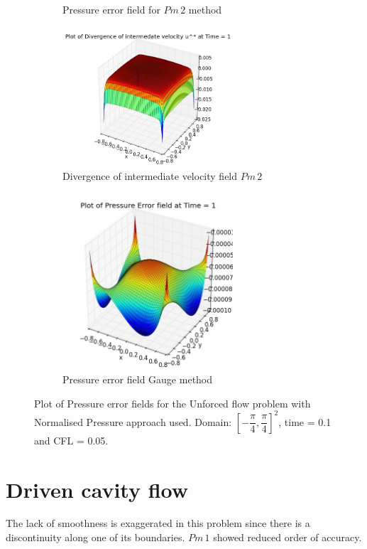 \begin{figure}[H]
\begin{subfigure}[t]{2.5in}
		\caption{Pressure error field for $Pm\,2$ method}\label{fig:6.19a}		
	\end{subfigure}
	\quad
	\begin{subfigure}[t]{2.5in}
		\centering
		\includegraphics[width=2.5in]{figures/Pm2_unf1_np_div_uvstar_t_1_grid_60.jpg}
		\caption{Divergence of intermediate velocity field $Pm\,2$}\label{fig:6.19b}
	\end{subfigure}
	\quad
	\begin{subfigure}[t]{2.5in}
		\centering
		\includegraphics[width=2.5in]{figures/Gauge_unf1_P_error_t_1_grid_60.jpg}
		\caption{Pressure error field Gauge method }\label{fig:6.19b}
	\end{subfigure}
	\caption{Plot of Pressure error fields for the Unforced flow problem with Normalised Pressure approach used. Domain: $[-\dfrac{\pi}{4}, \dfrac{\pi}{4}]^2$, time = 0.1 and CFL = 0.05.}\label{fig:6.16}
\end{figure}

\section{Driven cavity flow}
The lack of smoothness is exaggerated in this problem since there is a discontinuity along one of its boundaries. $Pm\,1$ showed reduced order of accuracy.

